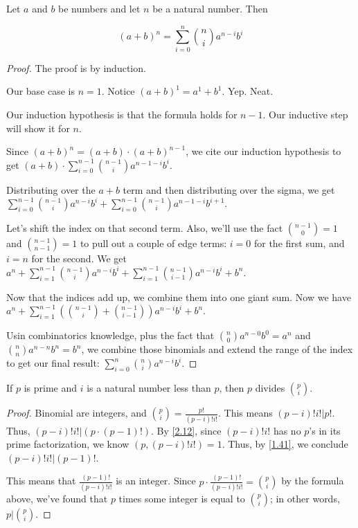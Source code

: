 \documentclass[../main.tex]{subfiles}
\begin{document}
\begin{thm} \label{4.24}
  Let $a$ and $b$ be numbers and let $n$ be a natural number. Then

  $$(a+b)^n = \sum_{i=0}^n \binom{n}{i}a^{n-i}b^i$$
\end{thm}

\begin{proof}
  The proof is by induction.

  Our base case is $n = 1$. Notice $(a+b)^1 = a^1 + b^1$. Yep. Neat.

  Our induction hypothesis is that the formula holds for $n-1$. Our inductive step will show it for $n$.

  Since $(a+b)^n = (a+b) \cdot (a+b)^{n-1}$, we cite our induction hypothesis to get $(a+b) \cdot \sum_{i=0}^{n-1} \binom{n-1}{i}a^{n-1-i}b^i$.

  Distributing over the $a+b$ term and then distributing over the sigma, we get $\sum_{i=0}^{n-1} \binom{n-1}{i}a^{n-i}b^i + \sum_{i=0}^{n-1} \binom{n-1}{i}a^{n-1-i}b^{i+1}$.

  Let's shift the index on that second term. Also, we'll use the fact $\binom{n-1}{0} = 1$ and $\binom{n-1}{n-1} = 1$ to pull out a couple of edge terms: $i = 0$ for the first sum, and $i = n$ for the second. We get $a^n + \sum_{i=1}^{n-1} \binom{n-1}{i}a^{n-i}b^i + \sum_{i=1}^{n-1} \binom{n-1}{i-1}a^{n-i}b^{i} + b^n$.

  Now that the indices add up, we combine them into one giant sum. Now we have $a^n + \sum_{i=1}^{n-1} (\binom{n-1}{i} + \binom{n-1}{i-1})a^{n-i}b^i + b^n$.

  Usin combinatorics knowledge, plus the fact that $\binom{n}{0}a^{n-0}b^0 = a^n$ and $\binom{n}{n}a^{n-n}b^n = b^n$, we combine those binomials and extend the range of the index to get our final result: $\sum_{i=0}^n \binom{n}{i}a^{n-i}b^i$.
\end{proof}



\begin{thm} \label{4.25}
  If $p$ is prime and $i$ is a natural number less than $p$, then $p$ divides $\binom{p}{i}$.
\end{thm}

\begin{proof}
  Binomial are integers, and $\binom{p}{i} = \frac{p!}{(p-i)!i!}$. This means $(p-i)!i! | p!$. Thus, $(p-i)!i! | (p \cdot (p-1)!)$. By \ref{2.12}, since $(p-i)!i!$ has no $p$'s in its prime factorization, we know $(p, (p-i)!i!) = 1$. Thus, by \ref{1.41}, we conclude $(p-i)!i! | (p-1)!$.

  This means that $\frac{(p-1)!}{(p-i)!i!}$ is an integer. Since $p \cdot \frac{(p-1)!}{(p-i)!i!} = \binom{p}{i}$ by the formula above, we've found that $p$ times some integer is equal to $\binom{p}{i}$; in other words, $p | \binom{p}{i}$.
\end{proof}
\end{document}
